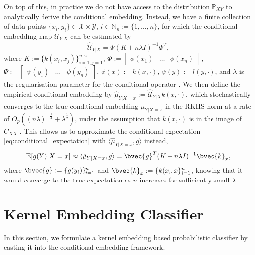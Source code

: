 \documentclass{article}
\begin{document}
	On top of this, in practice we do not have access to the distribution $\mathbb{P}_{X Y}$ to analytically derive the conditional embedding. Instead, we have a finite collection of data points $\{x_{i}, y_{i}\} \in \mathcal{X} \times \mathcal{Y}$, $i \in \mathbb{N}_{n} := \{1, \dots, n\}$, for which the conditional embedding map $\mathcal{U}_{Y | X}$ can be estimated by
	\begin{equation}
		\hat{\mathcal{U}}_{Y | X} = \Psi (K + n \lambda I)^{-1} \Phi^{T},
	\label{eq:empirical_conditional_embedding}
	\end{equation}
	where $K := \{k(x_{i}, x_{j})\}_{i = 1, j = 1}^{n, n}$, $\Phi := \begin{bmatrix} \phi(x_{1}) & \dots & \phi(x_{n}) \end{bmatrix}$, $\Psi := \begin{bmatrix} \psi(y_{1}) & \dots & \psi(y_{n}) \end{bmatrix}$, $\phi(x) := k(x, \cdot)$, $\psi(y) := l(y, \cdot)$, and $\lambda$ is the regularisation parameter for the conditional operator \citep{song2013kernel}. We then define the empirical conditional embedding by $\hat{\mu}_{Y | X = x} := \hat{\mathcal{U}}_{Y | X} k(x, \cdot)$, which stochastically converges to the true conditional embedding $\mu_{Y | X = x}$ in the RKHS norm at a rate of $O_{p}((n \lambda)^{-\frac{1}{2}} + \lambda^{\frac{1}{2}})$, under the assumption that $k(x, \cdot)$ is in the image of $C_{XX}$ \citet[Theorem 6]{song2009hilbert}. This allows us to approximate the conditional expectation \eqref{eq:conditional_expectation} with $\langle \hat{\mu}_{Y | X = x}, g \rangle$ instead, 
	\begin{equation}
		\mathbb{E}[g(Y) | X = x] \approx \langle \hat{\mu}_{Y | X = x}, g \rangle = \bvec{g}^{T} (K + n \lambda I)^{-1} \bvec{k}_{x},
	\label{eq:empirical_conditional_expectation}
	\end{equation}
	where $\bvec{g} := \{g(y_{i})\}_{i = 1}^{n}$ and $\bvec{k}_{x} := \{k(x_{i}, x\}_{i = 1}^{n}$, knowing that it would converge to the true expectation as $n$ increases for sufficiently small $\lambda$.
	
\section{Kernel Embedding Classifier}
\label{sec:kernel_embedding_classifier}

	In this section, we formulate a kernel embedding based probabilistic classifier by casting it into the conditional embedding framework.
\end{document}
